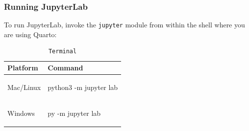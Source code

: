 \documentclass[
  letterpaper,
  DIV=11,
  numbers=noendperiod,
  oneside]{scrreprt}
\newenvironment{Shaded}{\begin{snugshade}}{\end{snugshade}}
\newcommand{\AttributeTok}[1]{\textcolor[rgb]{0.40,0.45,0.13}{#1}}
\newcommand{\ExtensionTok}[1]{\textcolor[rgb]{0.00,0.23,0.31}{#1}}
\newcommand{\NormalTok}[1]{\textcolor[rgb]{0.00,0.23,0.31}{#1}}
\newcommand{\OperatorTok}[1]{\textcolor[rgb]{0.37,0.37,0.37}{#1}}
\newcounter{none} %
\begin{document}
\begin{tcolorbox}
\subsubsection{Running JupyterLab}\label{running-jupyterlab}

To run JupyterLab, invoke the \texttt{jupyter} module from within the
shell where you are using Quarto:

{\def\LTcaptype{none} %
\begin{longtable}[]{@{}
  >{\raggedright\arraybackslash}p{}
  >{\raggedright\arraybackslash}p{}@{}}
\toprule\noalign{}
\begin{minipage}[b]{\linewidth}\raggedright
Platform
\end{minipage} & \begin{minipage}[b]{\linewidth}\raggedright
Command
\end{minipage} \\
\midrule\noalign{}
\endhead
\bottomrule\noalign{}
\endlastfoot
Mac/Linux & \begin{minipage}[t]{\linewidth}\raggedright
\begin{codelisting}[H]

\caption{\texttt{Terminal}}

\begin{Shaded}
\begin{Highlighting}[]
\ExtensionTok{python3} \AttributeTok{{-}m}\NormalTok{ jupyter lab}
\end{Highlighting}
\end{Shaded}

\end{codelisting}
\end{minipage} \\
Windows & \begin{minipage}[t]{\linewidth}\raggedright
\begin{codelisting}[H]

\caption{\texttt{Terminal}}

\begin{Shaded}
\begin{Highlighting}[]
\NormalTok{py }\OperatorTok{{-}}\NormalTok{m jupyter lab}
\end{Highlighting}
\end{Shaded}

\end{codelisting}
\end{minipage} \\
\end{longtable}
}


\end{tcolorbox}
\end{document}
